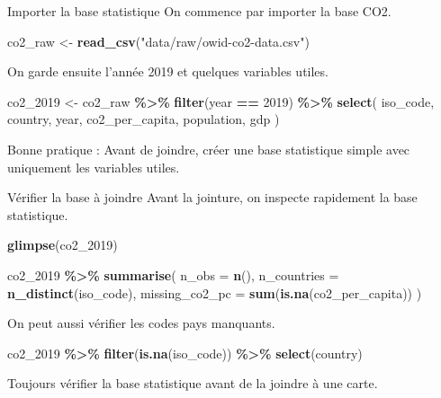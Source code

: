 \documentclass[
  10pt,
  ignorenonframetext,
]{beamer}
\newenvironment{Shaded}{\begin{snugshade}}{\end{snugshade}}
\newcommand{\AttributeTok}[1]{\textcolor[rgb]{0.13,0.29,0.53}{#1}}
\newcommand{\DecValTok}[1]{\textcolor[rgb]{0.00,0.00,0.81}{#1}}
\newcommand{\FunctionTok}[1]{\textcolor[rgb]{0.13,0.29,0.53}{\textbf{#1}}}
\newcommand{\NormalTok}[1]{#1}
\newcommand{\OtherTok}[1]{\textcolor[rgb]{0.56,0.35,0.01}{#1}}
\newcommand{\SpecialCharTok}[1]{\textcolor[rgb]{0.81,0.36,0.00}{\textbf{#1}}}
\newcommand{\StringTok}[1]{\textcolor[rgb]{0.31,0.60,0.02}{#1}}
\begin{document}
\begin{frame}[fragile]{Importer la base statistique}
\label{importer-la-base-statistique}
On commence par importer la base CO2.

\begin{Shaded}
\begin{Highlighting}[]
\NormalTok{co2\_raw }\OtherTok{\textless{}{-}} \FunctionTok{read\_csv}\NormalTok{(}\StringTok{"data/raw/owid{-}co2{-}data.csv"}\NormalTok{)}
\end{Highlighting}
\end{Shaded}

On garde ensuite l'année 2019 et quelques variables utiles.

\begin{Shaded}
\begin{Highlighting}[]
\NormalTok{co2\_2019 }\OtherTok{\textless{}{-}}\NormalTok{ co2\_raw }\SpecialCharTok{\%\textgreater{}\%}
  \FunctionTok{filter}\NormalTok{(year }\SpecialCharTok{==} \DecValTok{2019}\NormalTok{) }\SpecialCharTok{\%\textgreater{}\%}
  \FunctionTok{select}\NormalTok{(}
\NormalTok{    iso\_code, country, year,}
\NormalTok{    co2\_per\_capita, population, gdp}
\NormalTok{  )}
\end{Highlighting}
\end{Shaded}

Bonne pratique : Avant de joindre, créer une base statistique simple
avec uniquement les variables utiles.
\end{frame}

\begin{frame}[fragile]{Vérifier la base à joindre}
\label{vuxe9rifier-la-base-uxe0-joindre}
Avant la jointure, on inspecte rapidement la base statistique.

\begin{Shaded}
\begin{Highlighting}[]
\FunctionTok{glimpse}\NormalTok{(co2\_2019)}

\NormalTok{co2\_2019 }\SpecialCharTok{\%\textgreater{}\%}
  \FunctionTok{summarise}\NormalTok{(}
    \AttributeTok{n\_obs =} \FunctionTok{n}\NormalTok{(),}
    \AttributeTok{n\_countries =} \FunctionTok{n\_distinct}\NormalTok{(iso\_code),}
    \AttributeTok{missing\_co2\_pc =} \FunctionTok{sum}\NormalTok{(}\FunctionTok{is.na}\NormalTok{(co2\_per\_capita))}
\NormalTok{  )}
\end{Highlighting}
\end{Shaded}

On peut aussi vérifier les codes pays manquants.

\begin{Shaded}
\begin{Highlighting}[]
\NormalTok{co2\_2019 }\SpecialCharTok{\%\textgreater{}\%}
  \FunctionTok{filter}\NormalTok{(}\FunctionTok{is.na}\NormalTok{(iso\_code)) }\SpecialCharTok{\%\textgreater{}\%}
  \FunctionTok{select}\NormalTok{(country)}
\end{Highlighting}
\end{Shaded}

Toujours vérifier la base statistique avant de la joindre à une carte.
\end{frame}
\end{document}

